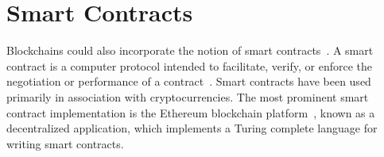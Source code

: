 \chapter{Smart Contracts}
\label{smart_contracts}

Blockchains could also incorporate the notion of smart contracts~\cite{ethreum}.
A smart contract is a computer protocol intended to facilitate, verify, or enforce the negotiation or performance of a contract~\cite{wiki:smart_contract}.
Smart contracts have been used primarily in association with cryptocurrencies. The most prominent smart contract implementation
is the Ethereum blockchain platform~\cite{ethreum}, known as a decentralized application, which implements a Turing complete language for writing smart contracts.
